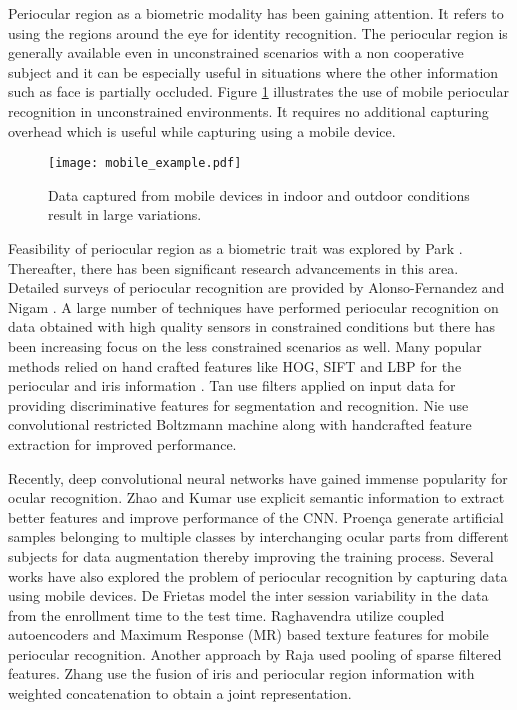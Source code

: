 \documentclass[10pt,twocolumn,letterpaper]{article}
\begin{document}
Periocular region as a biometric modality \cite{bharadwaj2010periocular,park2009periocular} has been gaining attention. It refers to using the regions around the eye for identity recognition. The periocular region is generally available even in unconstrained scenarios with a non cooperative subject and it can be especially useful in situations where the other information such as face is partially occluded. Figure \ref{fig:mobile_eg} illustrates the use of mobile periocular recognition in unconstrained environments. It requires no additional capturing overhead which is useful while capturing using a mobile device. 
\begin{figure}
  \centering
  \texttt{[image: mobile\_example.pdf]}
  \caption{Data captured from mobile devices in indoor and outdoor conditions result in large variations.}
  \label{fig:mobile_eg}
\end{figure}
Feasibility of periocular region as a biometric trait was explored by Park \etal \cite{park2009periocular}. Thereafter, there has been significant research advancements in this area. Detailed surveys of periocular recognition are provided by Alonso-Fernandez \etal \cite{alonso2016survey} and Nigam \etal \cite{nigam2015ocular}. A large number of techniques have performed periocular recognition on data obtained with high quality sensors in constrained conditions but there has been increasing focus on the less constrained scenarios as well.
Many popular methods relied on hand crafted features like HOG, SIFT and LBP for the periocular and iris information \cite{bharadwaj2010periocular,nigam2015ocular}. %
Tan \etal \cite{tan2013towards} use filters applied on input data for providing discriminative features for segmentation and recognition. Nie \etal \cite{nie2014periocular} use convolutional restricted Boltzmann machine along with handcrafted feature extraction for improved performance.

Recently, deep convolutional neural networks have gained immense popularity for ocular recognition. Zhao and Kumar \cite{zhao2017accurate} use explicit semantic information to extract better features and improve performance of the CNN. Proen\c ca \etal \cite{proencca2018deep}
generate artificial samples belonging to multiple classes by interchanging ocular parts from different subjects for data augmentation thereby improving the training process. Several works have also explored the problem of periocular recognition by capturing data using mobile devices. De Frietas \etal \cite{de2015periocular} model the inter session variability in the data from the enrollment time to the test time. %
Raghavendra \etal \cite{raghavendra2016learning} utilize coupled autoencoders and Maximum Response (MR) based texture features for mobile periocular recognition. Another approach by Raja \etal \cite{raja2016collaborative} used pooling of sparse filtered features. Zhang \etal \cite{zhang2018deep} use the fusion of iris and periocular region information with weighted concatenation to obtain a joint representation.
\end{document}
